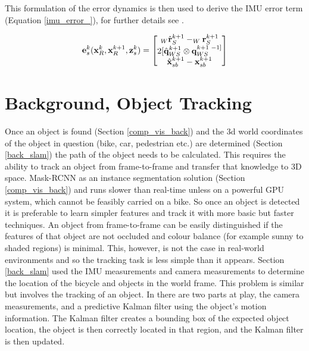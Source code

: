\documentclass[a4paper,11pt,notitlepage]{article}
\begin{document}
This formulation of the error dynamics is then used to derive the IMU error term (Equation \ref{imu_error_}), for further details see \cite{Okvis_1}.


\begin{equation}
\mathbf{e}^{k}_{s}(\mathbf{x}^{k}_{R},\mathbf{x}^{k+1}_{R},\mathbf{z}_{s}^{k}) = 
\begin{bmatrix}
       _{W} \hat{\mathbf{r}}_{S}^{k+1} - _{W}\mathbf{r}_{S}^{k+1} \\
       
       2[\hat{\mathbf{q}}_{WS}^{k+1} \otimes \mathbf{q}_{WS}^{k+1 \textnormal{ } -1]} \\
       
       \hat{\mathbf{x}}^{k+1}_{sb} - \mathbf{x}_{sb}^{k+1}
\end{bmatrix}
\label{imu_error_}
\end{equation}


\section{Background, Object Tracking}

Once an object is found (Section \ref{comp_vis_back}) and the 3d world coordinates of the object in question (bike, car, pedestrian etc.) are determined (Section \ref{back_slam}) the path of the object needs to be calculated. This requires the ability to track an object from frame-to-frame and transfer that knowledge to 3D space. Mask-RCNN as an instance segmentation solution (Section \ref{comp_vis_back}) and runs slower than real-time unless on a powerful GPU system, which cannot be feasibly carried on a bike. So once an object is detected it is preferable to learn simpler features and track it with more basic but faster techniques. An object from frame-to-frame can be easily distinguished if the features of that object are not occluded and colour balance (for example sunny to shaded regions) is minimal. This, however, is not the case in real-world environments and so the tracking task is less simple than it appears.
\newline \newline
Section \ref{back_slam} used the IMU measurements and camera measurements to determine the location of the bicycle and objects in the world frame. This problem is similar but involves the tracking of an object. In \cite{Ped_tract} there are two parts at play, the camera measurements, and a predictive Kalman filter using the object's motion information. The Kalman filter creates a bounding box of the expected object location, the object is then correctly located in that region, and the Kalman filter is then updated.
\end{document}
